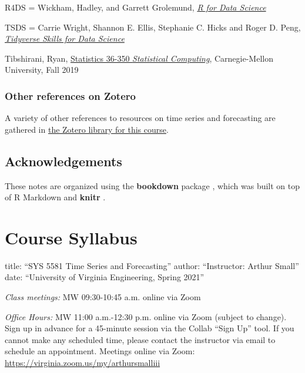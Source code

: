 \documentclass[
]{book}
\begin{document}
R4DS = Wickham, Hadley, and Garrett Grolemund, \href{https://r4ds.had.co.nz/}{\emph{R for Data Science}}

TSDS = Carrie Wright, Shannon E. Ellis, Stephanie C. Hicks and Roger D. Peng, \href{https://jhudatascience.org/tidyversecourse/}{\emph{Tidyverse Skills for Data Science}}

Tibshirani, Ryan, \href{https://www.stat.cmu.edu/~ryantibs/statcomp/}{Statistics 36-350 \emph{Statistical Computing}}, Carnegie-Mellon University, Fall 2019

\hypertarget{other-references-on-zotero}{%
\subsection*{Other references on Zotero}\label{other-references-on-zotero}}

A variety of other references to resources on time series and forecasting are gathered in \href{https://www.zotero.org/groups/2555186/uva_engineering_time_series_and_forecasting/library}{the Zotero library for this course}.

\hypertarget{acknowledgements}{%
\section*{Acknowledgements}\label{acknowledgements}}

These notes are organized using the \textbf{bookdown} package \citep{R-bookdown}, which was built on top of R Markdown and \textbf{knitr} \citep{xie2015}.

\hypertarget{course-syllabus}{%
\chapter*{Course Syllabus}\label{course-syllabus}}

title: ``SYS 5581 Time Series and Forecasting''
author: ``Instructor: Arthur Small''
date: ``University of Virginia Engineering, Spring 2021''

\emph{Class meetings:} MW 09:30-10:45 a.m. online via Zoom

\emph{Office Hours:} MW 11:00 a.m.-12:30 p.m. online via Zoom (subject to change). Sign up in advance for a 45-minute session via the Collab ``Sign Up'' tool. If you cannot make any scheduled time, please contact the instructor via email to schedule an appointment. Meetings online via Zoom: \url{https://virginia.zoom.us/my/arthursmalliii}
\end{document}
